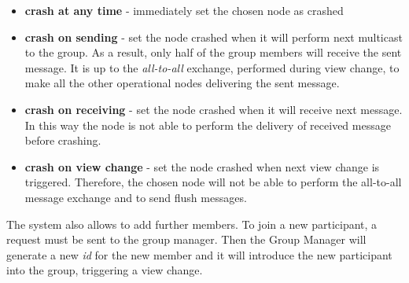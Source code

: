 \documentclass[11pt]{article}
\begin{document}
	\begin{itemize}
		\item \textbf{crash at any time} - immediately set the chosen node as crashed
		\item \textbf{crash on sending} - set the node crashed when it will perform next multicast to the group. As a result, only half of the group members will receive the sent message. It is up to the \textit{all-to-all} exchange, performed during view change, to make all the other operational nodes delivering the sent message.
		\item \textbf{crash on receiving} - set the node crashed when it will receive next message. In this way the node is not able to perform the delivery of received message before crashing.
		\item \textbf{crash on view change} - set the node crashed when next view change is triggered. Therefore, the chosen node will not be able to perform the all-to-all message exchange and to send flush messages.
	\end{itemize}
	
	The system also allows to add further members. To join a new participant, a request must be sent to the group manager. Then the Group Manager will generate a new \textit{id} for the new member and it will introduce the new participant into the group, triggering a view change.
		
\end{document}
